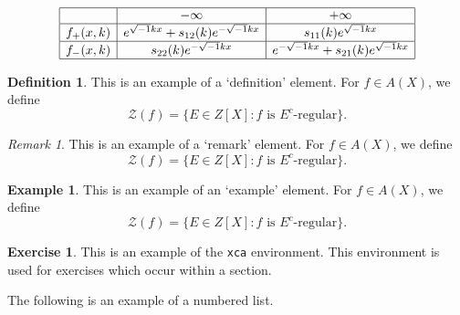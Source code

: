 \documentclass{amsart}
\theoremstyle{definition}
\newtheorem{definition}[theorem]{Definition}
\newtheorem{example}[theorem]{Example}
\newtheorem{xca}[theorem]{Exercise}
\theoremstyle{remark}
\newtheorem{remark}[theorem]{Remark}
\numberwithin{equation}{section}
\begin{document}
\begin{table}[ht]
\caption{}\label{eqtable}
\renewcommand\arraystretch{1.5}
\noindent\[
\begin{array}{|c|c|c|}
\hline
&{-\infty}&{+\infty}\\
\hline
{f_+(x,k)}&e^{\sqrt{-1}kx}+s_{12}(k)e^{-\sqrt{-1}kx}&s_{11}(k)e^
{\sqrt{-1}kx}\\
\hline
{f_-(x,k)}&s_{22}(k)e^{-\sqrt{-1}kx}&e^{-\sqrt{-1}kx}+s_{21}(k)e^{\sqrt
{-1}kx}\\
\hline
\end{array}
\]
\end{table}

\begin{definition}
This is an example of a `definition' element.
For $f\in A(X)$, we define
\begin{equation}
\mathcal{Z} (f)=\{E\in Z[X]: \text{$f$ is $E^c$-regular}\}.
\end{equation}
\end{definition}

\begin{remark}
This is an example of a `remark' element.
For $f\in A(X)$, we define
\begin{equation}
\mathcal{Z} (f)=\{E\in Z[X]: \text{$f$ is $E^c$-regular}\}.
\end{equation}
\end{remark}

\begin{example}
This is an example of an `example' element.
For $f\in A(X)$, we define
\begin{equation}
\mathcal{Z} (f)=\{E\in Z[X]: \text{$f$ is $E^c$-regular}\}.
\end{equation}
\end{example}

\begin{xca}
This is an example of the \texttt{xca} environment. This environment is
used for exercises which occur within a section.
\end{xca}

The following is an example of a numbered list.
\end{document}
